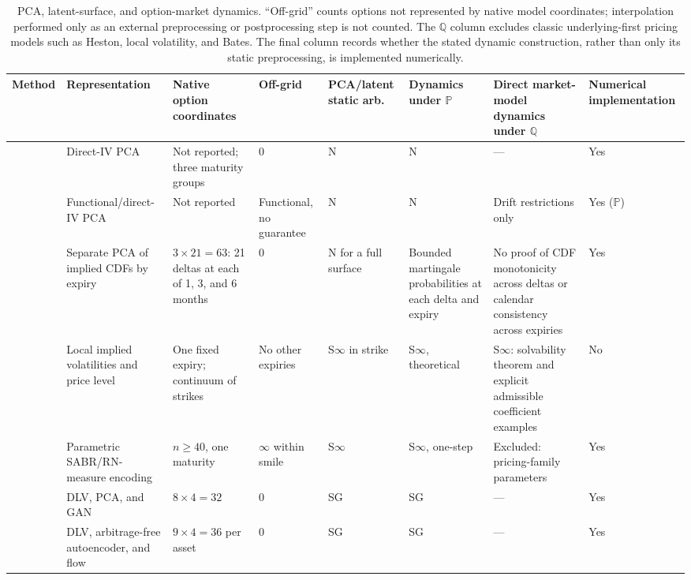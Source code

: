 \documentclass[11pt,a4paper]{article}
\newcommand{\Q}{\mathbb{Q}}
\renewcommand{\P}{\mathbb{P}}
\renewcommand{\Q}{\mathbb{Q}}
\begin{document}
\begin{landscape}
\begin{table}[p]
\centering
\fontsize{7}{7.8}\selectfont
\setlength{\tabcolsep}{2.6pt}
\renewcommand{\arraystretch}{1.04}
\caption{PCA, latent-surface, and option-market dynamics.  ``Off-grid'' counts
options not represented by native model coordinates; interpolation performed
only as an external preprocessing or postprocessing step is not counted.
The $\Q$ column excludes classic underlying-first pricing models such as
Heston, local volatility, and Bates.  The final column records whether the
stated dynamic construction, rather than only its static preprocessing, is
implemented numerically.}
\label{tab:surface-dynamics-literature}
\begin{tabular}{@{}p{3.8cm}p{3.0cm}p{2.5cm}p{1.3cm}p{2.2cm}p{2.2cm}p{3.2cm}p{1.7cm}@{}}
\toprule
Method & Representation & Native option coordinates & Off-grid & PCA/latent static arb. & Dynamics under $\P$ & Direct market-model dynamics under $\Q$ & Numerical implementation \\
\midrule
\citet{SkiadopoulosHodgesClewlow2000}
  & Direct-IV PCA & Not reported; three maturity groups & 0 & N & N & --- & Yes \\
\citet{ContVol}
  & Functional/direct-IV PCA & Not reported & Functional, no guarantee & N & N & Drift restrictions only & Yes ($\P$) \\
\citet{PanigirtzoglouSkiadopoulos2004}
  & Separate PCA of implied CDFs by expiry & $3\times21=63$: 21 deltas at each of 1, 3, and 6 months & 0 & N for a full surface & Bounded martingale probabilities at each delta and expiry & No proof of CDF monotonicity across deltas or calendar consistency across expiries & Yes \\
\citet{SchweizerWissel2008}
  & Local implied volatilities and price level & One fixed expiry; continuum of strikes & No other expiries & S$\infty$ in strike & S$\infty$, theoretical & S$\infty$: solvability theorem and explicit admissible coefficient examples & No \\
\citet{DellaportasMijatovic2014}
  & Parametric SABR/RN-measure encoding & $n\geq40$, one maturity & $\infty$ within smile & S$\infty$ & S$\infty$, one-step & Excluded: pricing-family parameters & Yes \\
\citet{wiese2019simulate}
  & DLV, PCA, and GAN & $8\times4=32$ & 0 & SG & SG & --- & Yes \\
\citet{wiese2021multiassetspotoptionmarket}
  & DLV, arbitrage-free autoencoder, and flow & $9\times4=36$ per asset & 0 & SG & SG & --- & Yes \\

\end{tabular}
\end{table}
\end{landscape}
\end{document}

